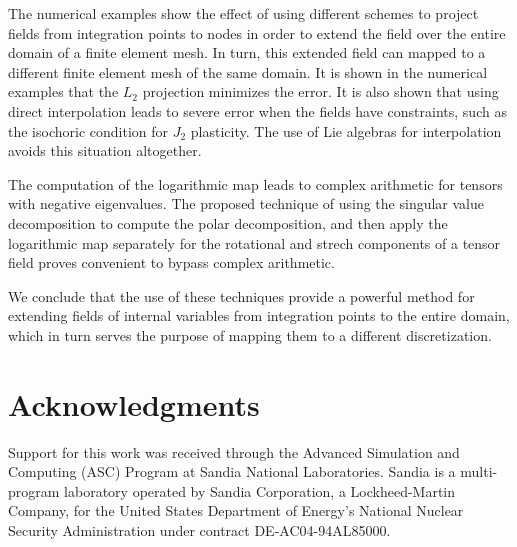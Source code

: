 \documentclass[12pt]{article}
\begin{document}
The numerical examples show the effect of using different schemes to project
fields from integration points to nodes in order to extend the field over the
entire domain of a finite element mesh. In turn, this extended field can mapped
to a different finite element mesh of the same domain. It is shown in the
numerical examples that the $L_2$ projection minimizes the error.
It is also shown that using direct interpolation leads to severe error when the
fields have constraints, such as the isochoric condition for $J_2$ plasticity.
The use of Lie algebras for interpolation avoids this situation altogether.

The computation of the logarithmic map leads to complex arithmetic for tensors
with negative eigenvalues. The proposed technique of using the singular value
decomposition to compute the polar decomposition, and then apply the logarithmic
map separately for the rotational and strech components of a tensor field proves
convenient to bypass complex arithmetic.

We conclude that the use of these techniques provide a powerful method for
extending fields of internal variables from integration points to the entire
domain, which in turn serves the purpose of mapping them to a different
discretization.

\section{Acknowledgments}

Support for this work was received through the Advanced Simulation and Computing
(ASC) Program at Sandia National Laboratories. Sandia is a multi-program
laboratory operated by Sandia Corporation, a Lockheed-Martin Company, for the
United States Department of Energy's National Nuclear Security Administration
under contract DE-AC04-94AL85000.



\end{document}
